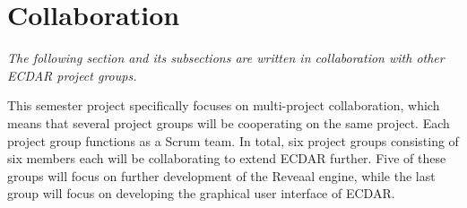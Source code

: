 \section{Collaboration}\label{sec:cooperation}
\textit{The following section and its subsections are written in collaboration with other ECDAR project groups.}\vspace{1em}

\noindent This semester project specifically focuses on multi-project collaboration, which means that several project groups will be cooperating on the same project. 
Each project group functions as a Scrum team. 
In total, six project groups consisting of six members each will be collaborating to extend ECDAR further. 
Five of these groups will focus on further development of the Reveaal engine, while the last group will focus on developing the graphical user interface of ECDAR.

